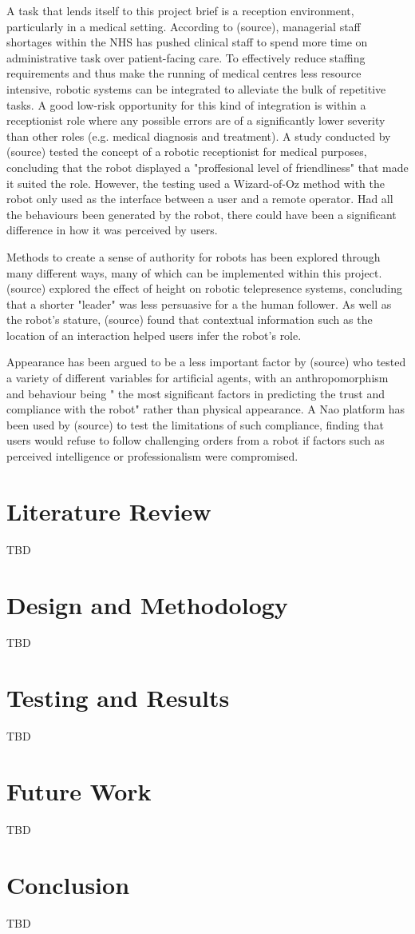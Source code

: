 \documentclass[conference]{IEEEtran}
\begin{document}
A task that lends itself to this project brief is a reception environment, particularly in a medical setting. According to 
(source), managerial staff shortages within the NHS has pushed clinical staff to spend more time on administrative task over 
patient-facing care. To effectively reduce staffing requirements and thus make the running of medical centres less resource intensive, robotic 
systems can be integrated to alleviate the bulk of repetitive tasks. A good low-risk opportunity for this kind of integration is within a 
receptionist role where any possible errors are of a significantly lower severity than other roles (e.g. medical diagnosis and treatment).
A study conducted by (source) tested the concept of a robotic receptionist for medical purposes, concluding that the robot displayed a 
"proffesional level of friendliness" that made it suited the role. However, the testing used a Wizard-of-Oz method with the robot only 
used as the interface between a user and a remote operator. Had all the behaviours been generated by the robot, there could have been 
a significant difference in how it was perceived by users.

Methods to create a sense of authority for robots has been explored through many different ways, many of which can be implemented within 
this project. (source) explored the effect of height on robotic telepresence systems, concluding that a shorter "leader" was less persuasive 
for a the human follower. As well as the robot's stature, (source) found that contextual information such as the location of an interaction 
helped users infer the robot’s role.

Appearance has been argued to be a less important factor by (source) who tested a variety of different variables for artificial agents, with an 
anthropomorphism and behaviour being " the most significant factors in predicting the trust and compliance with the robot" rather 
than physical appearance. A Nao platform has been used by (source) to test the limitations of such compliance, finding that users would 
refuse to follow challenging orders from a robot if factors such as perceived intelligence or professionalism were compromised.


\section{Literature Review}

TBD
\section{Design and Methodology}

TBD

\section{Testing and Results}

TBD

\section{Future Work}

TBD

\section{Conclusion}

TBD



\end{document}
